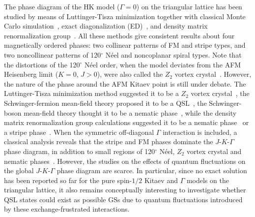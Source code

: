 \documentclass[aps,prb,reprint,amsfonts,amsmath,amssymb,showpacs,groupedaddress,superscriptaddress]{revtex4-1}
\begin{document}
The phase diagram of the HK model ($\Gamma=0$) on the triangular lattice has been studied by means of Luttinger-Tisza minimization together with classical Monte Carlo simulation~\cite{PhysRevB.93.104417}, exact diagonalization (ED)~\cite{KaiLi2015,PhysRevB.91.155135}, and density matrix renormalization group~\cite{JPSJ.85.114710,PhysRevX.9.021017}. All these methods give consistent results about four magnetically ordered phases: two collinear patterns of FM and stripe types, and two noncollinear patterns of 120$^\circ$ N\'{e}el and noncoplanar spiral types. Note that the distortions of the 120$^\circ$ N\'{e}el order, when the model deviates from the AFM Heisenberg limit ($K=0$, $J>0$), were also called the $Z_{2}$ vortex crystal~\cite{PhysRevB.93.104417,PhysRevB.91.155135,JPSJ.85.114710,PhysRevResearch.1.013002,PhysRevResearch.2.013205}. However, the nature of the phase around the AFM Kitaev point is still under debate. The Luttinger-Tisza minimization method suggested it to be a $Z_{2}$ vortex crystal~\cite{PhysRevB.93.104417}, the Schwinger-fermion mean-field theory proposed it to be a QSL~\cite{KaiLi2015}, the Schwinger-boson mean-field theory thought it to be a nematic phase~\cite{PhysRevB.95.024421}, while the density matrix renormalization group calculations suggested it to be a nematic phase~\cite{PhysRevB.91.155135,JPSJ.85.114710} or a stripe phase~\cite{PhysRevX.9.021017}. When the symmetric off-diagonal $\Gamma$ interaction is included, a classical analysis reveals that the stripe and FM phases dominate the $J$-$K$-$\Gamma$ phase diagram, in addition to small regions of 120$^\circ$ N\'{e}el, $Z_{2}$ vortex crystal and nematic phases~\cite{PhysRevB.92.165108}. However, the studies on the effects of quantum fluctuations on the global $J$-$K$-$\Gamma$ phase diagram are scarce. In particular, since no exact solution has been reported so far for the pure spin-$1/2$ Kitaev and $\Gamma$ models on the triangular lattice, it also remains conceptually interesting to investigate whether QSL states could exist as possible GSs due to quantum fluctuations introduced by these exchange-frustrated interactions.
\end{document}
